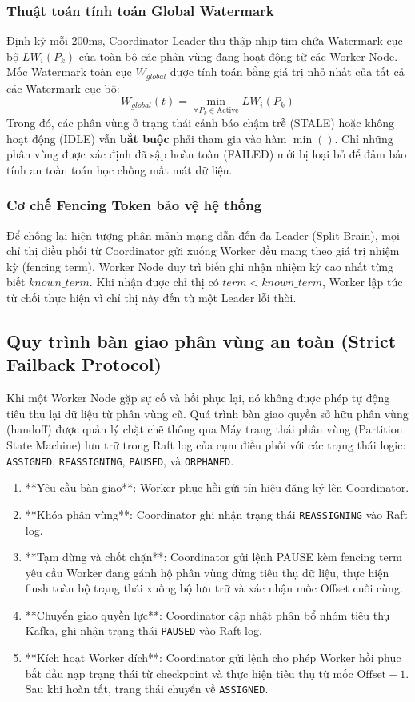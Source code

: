 \documentclass[12pt,a4paper]{article}
\begin{document}
\subsubsection{Thuật toán tính toán Global Watermark}
Định kỳ mỗi 200ms, Coordinator Leader thu thập nhịp tim chứa Watermark cục bộ $LW_i(P_k)$ của toàn bộ các phân vùng đang hoạt động từ các Worker Node. Mốc Watermark toàn cục $W_{global}$ được tính toán bằng giá trị nhỏ nhất của tất cả các Watermark cục bộ:
\begin{equation}
W_{global}(t) = \min_{\forall P_k \in \text{Active}} LW_i(P_k)
\end{equation}
Trong đó, các phân vùng ở trạng thái cảnh báo chậm trễ (STALE) hoặc không hoạt động (IDLE) vẫn \textbf{bắt buộc} phải tham gia vào hàm $\min()$. Chỉ những phân vùng được xác định đã sập hoàn toàn (FAILED) mới bị loại bỏ để đảm bảo tính an toàn toán học chống mất mát dữ liệu.

\subsubsection{Cơ chế Fencing Token bảo vệ hệ thống}
Để chống lại hiện tượng phân mảnh mạng dẫn đến đa Leader (Split-Brain), mọi chỉ thị điều phối từ Coordinator gửi xuống Worker đều mang theo giá trị nhiệm kỳ (fencing term). Worker Node duy trì biến ghi nhận nhiệm kỳ cao nhất từng biết $known\_term$. Khi nhận được chỉ thị có $term < known\_term$, Worker lập tức từ chối thực hiện vì chỉ thị này đến từ một Leader lỗi thời.

\subsection{Quy trình bàn giao phân vùng an toàn (Strict Failback Protocol)}
Khi một Worker Node gặp sự cố và hồi phục lại, nó không được phép tự động tiêu thụ lại dữ liệu từ phân vùng cũ. Quá trình bàn giao quyền sở hữu phân vùng (handoff) được quản lý chặt chẽ thông qua Máy trạng thái phân vùng (Partition State Machine) lưu trữ trong Raft log của cụm điều phối với các trạng thái logic: \texttt{ASSIGNED}, \texttt{REASSIGNING}, \texttt{PAUSED}, và \texttt{ORPHANED}.

\begin{enumerate}
    \item **Yêu cầu bàn giao**: Worker phục hồi gửi tín hiệu đăng ký lên Coordinator.
    \item **Khóa phân vùng**: Coordinator ghi nhận trạng thái \texttt{REASSIGNING} vào Raft log.
    \item **Tạm dừng và chốt chặn**: Coordinator gửi lệnh PAUSE kèm fencing term yêu cầu Worker đang gánh hộ phân vùng dừng tiêu thụ dữ liệu, thực hiện flush toàn bộ trạng thái xuống bộ lưu trữ và xác nhận mốc Offset cuối cùng.
    \item **Chuyển giao quyền lực**: Coordinator cập nhật phân bổ nhóm tiêu thụ Kafka, ghi nhận trạng thái \texttt{PAUSED} vào Raft log.
    \item **Kích hoạt Worker đích**: Coordinator gửi lệnh cho phép Worker hồi phục bắt đầu nạp trạng thái từ checkpoint và thực hiện tiêu thụ từ mốc $\text{Offset} + 1$. Sau khi hoàn tất, trạng thái chuyển về \texttt{ASSIGNED}.
\end{enumerate}
\end{document}

